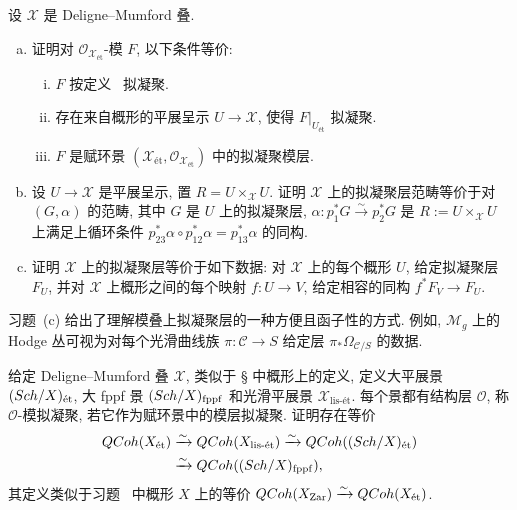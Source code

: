 \begin{exercise}[等价性 II]\label{src:5.1.24}
设 $\mathcal X$ 是 Deligne--Mumford 叠.
\begin{enumerate}[(a)]
\item 证明对 $\mathcal O_{\mathcal X_{\text{ét}}}$-模 $F$, 以下条件等价:
\begin{enumerate}[(i)]
\item $F$ 按定义~ 拟凝聚.
\item 存在来自概形的平展呈示 $U\to\mathcal X$, 使得 $F|_{U_{\text{ét}}}$ 拟凝聚.
\item $F$ 是赋环景 $(\mathcal X_{\text{ét}},\mathcal O_{\mathcal X_{\text{ét}}})$ 中的拟凝聚模层.
\end{enumerate}
\item 设 $U\to\mathcal X$ 是平展呈示, 置 $R=U\times_{\mathcal X}U$. 证明 $\mathcal X$ 上的拟凝聚层范畴等价于对 $(G,\alpha)$ 的范畴, 其中 $G$ 是 $U$ 上的拟凝聚层, $\alpha:p_1^*G\xrightarrow{\sim}p_2^*G$ 是 $R:=U\times_{\mathcal X}U$ 上满足上循环条件 $p_{23}^*\alpha\circ p_{12}^*\alpha=p_{13}^*\alpha$ 的同构.
\item 证明 $\mathcal X$ 上的拟凝聚层等价于如下数据: 对 $\mathcal X$ 上的每个概形 $U$, 给定拟凝聚层 $F_U$, 并对 $\mathcal X$ 上概形之间的每个映射 $f:U\to V$, 给定相容的同构 $f^*F_V\to F_U$.
\end{enumerate}
\end{exercise}
习题~(c) 给出了理解模叠上拟凝聚层的一种方便且函子性的方式. 例如, $\mathcal M_g$ 上的 Hodge 丛可视为对每个光滑曲线族 $\pi:\mathcal C\to S$ 给定层 $\pi_*\Omega_{\mathcal C/S}$ 的数据.
\begin{exercise}\label{src:5.1.25}
给定 Deligne--Mumford 叠 $\mathcal X$, 类似于 \S{} 中概形上的定义, 定义大平展景 $(Sch/X)_{\text{ét}}$, 大 fppf 景 $(Sch/X)_{\mathrm{fppf}}$ 和光滑平展景 $\mathcal X_{\text{lis-ét}}$. 每个景都有结构层 $\mathcal O$, 称 $\mathcal O$-模拟凝聚, 若它作为赋环景中的模层拟凝聚. 证明存在等价
\[
\begin{aligned}
QCoh(X_{\text{ét}})&\xrightarrow{\sim}QCoh(X_{\text{lis-ét}})\xrightarrow{\sim}QCoh((Sch/X)_{\text{ét}})\\
&\xrightarrow{\sim}QCoh((Sch/X)_{\mathrm{fppf}}),
\end{aligned}
\]
其定义类似于习题~ 中概形 $X$ 上的等价 $QCoh(X_{\mathrm{Zar}})\xrightarrow{\sim}QCoh(X_{\text{ét}})$.
\end{exercise}

